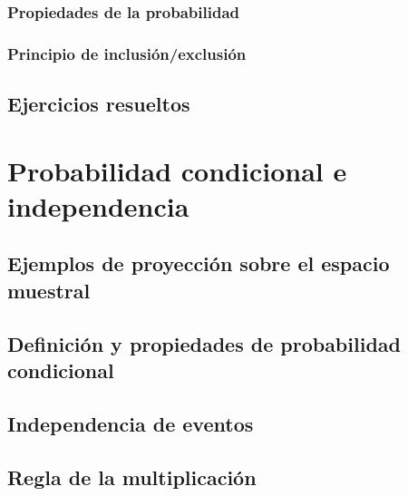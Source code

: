 \documentclass[
]{book}
\begin{document}
\hypertarget{propiedades-de-la-probabilidad}{%
\subsection{Propiedades de la probabilidad}\label{propiedades-de-la-probabilidad}}

\hypertarget{principio-de-inclusiuxf3nexclusiuxf3n-1}{%
\subsection{Principio de inclusión/exclusión}\label{principio-de-inclusiuxf3nexclusiuxf3n-1}}

\hypertarget{ejercicios-resueltos-1}{%
\section{Ejercicios resueltos}\label{ejercicios-resueltos-1}}

\hypertarget{probacond}{%
\chapter{Probabilidad condicional e independencia}\label{probacond}}

\hypertarget{ejemplos-de-proyecciuxf3n-sobre-el-espacio-muestral}{%
\section{Ejemplos de proyección sobre el espacio muestral}\label{ejemplos-de-proyecciuxf3n-sobre-el-espacio-muestral}}

\hypertarget{definiciuxf3n-y-propiedades-de-probabilidad-condicional}{%
\section{Definición y propiedades de probabilidad condicional}\label{definiciuxf3n-y-propiedades-de-probabilidad-condicional}}

\hypertarget{independencia-de-eventos}{%
\section{Independencia de eventos}\label{independencia-de-eventos}}

\hypertarget{regla-de-la-multiplicaciuxf3n}{%
\section{Regla de la multiplicación}\label{regla-de-la-multiplicaciuxf3n}}
\end{document}
